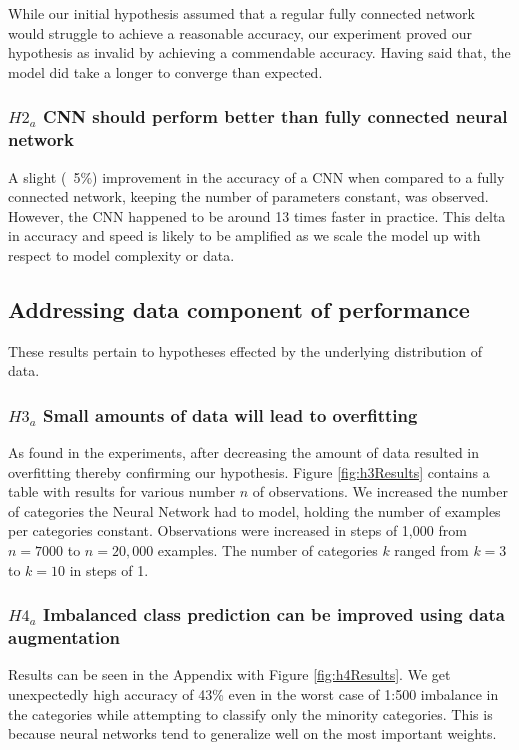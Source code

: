 \documentclass[11pt]{article}
\begin{document}
While our initial hypothesis assumed that a regular fully connected
network would struggle to achieve a reasonable accuracy, our experiment
proved our hypothesis as invalid by achieving a commendable accuracy.
Having said that, the model did take a longer to converge than expected. 

\subsubsection{$H2_a$\: CNN should perform better than fully connected neural
  network}

A slight (~5\%) improvement in the accuracy of a CNN when compared to a fully
connected network, keeping the number of parameters constant, was observed.
However, the CNN happened to be around 13 times faster in practice. This
delta in accuracy and speed is likely to be amplified as we scale the model
up with respect to model complexity or data.

\subsection{Addressing data component of performance}

These results pertain to hypotheses effected by the underlying
distribution of data.

\subsubsection{$H3_a$\: Small amounts of data will lead to overfitting}

As found in the experiments, after decreasing the amount of data resulted
in overfitting thereby confirming our hypothesis. Figure \ref{fig:h3Results}
contains a table with results for various number $n$ of observations.
We increased the number of categories the Neural Network had to model,
holding the number of examples per categories constant. Observations were
increased in steps of 1,000 from $n=7000$ to $n=20,000$ examples. The
number of categories $k$ ranged from $k=3$ to $k=10$ in steps of 1.

\subsubsection{$H4_a$\: Imbalanced class prediction can be improved using
  data augmentation}

Results can be seen in the Appendix with Figure \ref{fig:h4Results}. 
We get unexpectedly high accuracy of 43\% even in the worst case of 1:500
imbalance in the categories while attempting to classify only the minority
categories. This is because neural networks tend to generalize well on the
most important weights.
\end{document}
